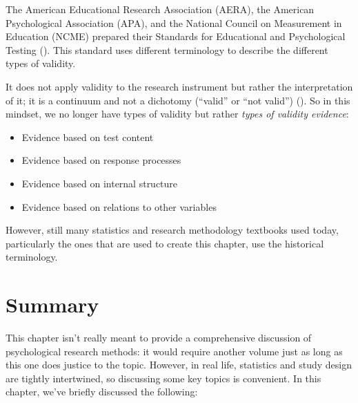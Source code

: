 \documentclass[
  11pt,
  a4paper,
  twoside,symmetric,openright]{book}
\providecommand{\tightlist}{%
  \setlength{\itemsep}{0pt}\setlength{\parskip}{0pt}}
\theoremstyle{break}
\theoremstyle{break}
\begin{document}
\label{calloutvalidityterminology}
\begin{callout}

The American Educational Research Association (AERA), the American Psychological Association (APA), and the National Council on Measurement in Education (NCME) prepared their Standards for Educational and Psychological Testing (). This standard uses different terminology to describe the different types of validity.

It does not apply validity to the research instrument but rather the interpretation of it; it is a continuum and not a dichotomy (``valid'' or ``not valid'') (). So in this mindset, we no longer have types of validity but rather \emph{types of validity evidence}:

\begin{itemize}
\tightlist
\item
  Evidence based on test content
\item
  Evidence based on response processes
\item
  Evidence based on internal structure
\item
  Evidence based on relations to other variables
\end{itemize}

However, still many statistics and research methodology textbooks used today, particularly the ones that are used to create this chapter, use the historical terminology.

\end{callout}

\section*{Summary}\label{summary}

This chapter isn't really meant to provide a comprehensive discussion of psychological research methods: it would require another volume just as long as this one does justice to the topic. However, in real life, statistics and study design are tightly intertwined, so discussing some key topics is convenient. In this chapter, we've briefly discussed the following:
\end{document}
